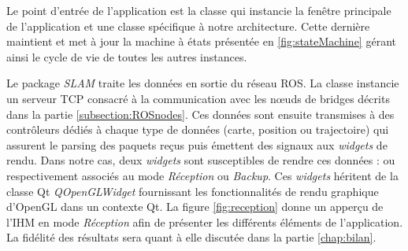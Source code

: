 \begin{figure}[h]
  \label{fig:modelIHM}
\end{figure}

Le point d'entrée de l'application est la classe  qui instancie la fenêtre principale de l'application \cite{Bib_qmainwindow} et une classe  spécifique à notre architecture.
Cette dernière maintient et met à jour la machine à états présentée en \ref{fig:stateMachine} gérant ainsi le cycle de vie de toutes les autres instances.  

Le package \emph{SLAM} traite les données en sortie du réseau \gls{ROS}. 
La classe  instancie un serveur \gls{TCP} consacré à la communication avec les n\oe{}uds de bridges décrits dans la partie \ref{subsection:ROSnodes}. 
Ces données sont ensuite transmises à des contrôleurs dédiés à chaque type de données (carte, position ou trajectoire) qui assurent le parsing des paquets reçus puis émettent des signaux aux \emph{widgets} de rendu. 
Dans notre cas, deux \emph{widgets} sont susceptibles de rendre ces données :  ou  respectivement associés au mode \emph{Réception} ou \emph{Backup}.
Ces \emph{widgets} héritent de la classe Qt \emph{QOpenGLWidget} fournissant les fonctionnalités de rendu graphique d'OpenGL dans un contexte Qt. 
La figure \ref{fig:reception} donne un apperçu de l'\gls{IHM} en mode \emph{Réception} afin de présenter les différents éléments de l'application. 
La fidélité des résultats sera quant à elle discutée dans la partie \ref{chap:bilan}.  

